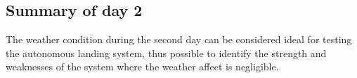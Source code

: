 \subsection{Summary of day 2}\label{ss:SummaryDay2}
The weather condition during the second day can be considered ideal for testing the autonomous landing system, thus possible to identify the strength and weaknesses of the system where the weather affect is negligible.


